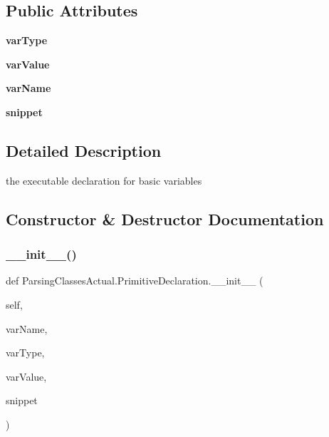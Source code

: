 \subsection*{Public Attributes}
\begin{DoxyCompactItemize}
\item 
\mbox{\label{class_parsing_classes_actual_1_1_primitive_declaration_ae5fc258d63388772900ec90292bfa93b}} 
{\bfseries var\+Type}
\item 
\mbox{\label{class_parsing_classes_actual_1_1_primitive_declaration_aa004c4838a78727250c5e57800f7cc04}} 
{\bfseries var\+Value}
\item 
\mbox{\label{class_parsing_classes_actual_1_1_primitive_declaration_a4e97c443c0dea443025440db19cc6e8e}} 
{\bfseries var\+Name}
\item 
\mbox{\label{class_parsing_classes_actual_1_1_primitive_declaration_a8089c6671008a7bca9d0fdb9a392a12b}} 
{\bfseries snippet}
\end{DoxyCompactItemize}


\subsection{Detailed Description}
the executable declaration for basic variables 

\subsection{Constructor \& Destructor Documentation}
\mbox{\label{class_parsing_classes_actual_1_1_primitive_declaration_a597dcbd2c1f074b88dc6ca01f2009983}} 
\subsubsection{\texorpdfstring{\+\_\+\+\_\+init\+\_\+\+\_\+()}{\_\_init\_\_()}}
{\footnotesize\ttfamily def Parsing\+Classes\+Actual.\+Primitive\+Declaration.\+\_\+\+\_\+init\+\_\+\+\_\+ (\begin{DoxyParamCaption}\item[{}]{self,  }\item[{}]{var\+Name,  }\item[{}]{var\+Type,  }\item[{}]{var\+Value,  }\item[{}]{snippet }\end{DoxyParamCaption})}



